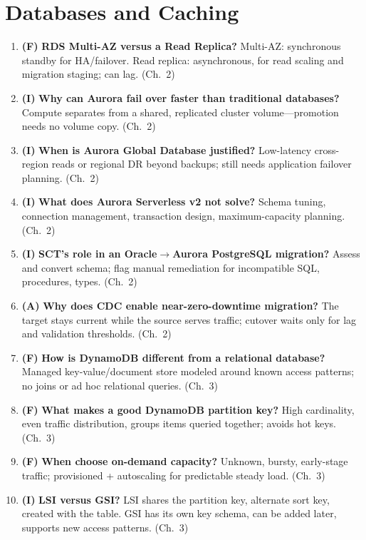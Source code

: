 \section{Databases and Caching}
\begin{enumerate}
    \item \textbf{(F)} \textbf{RDS Multi-AZ versus a Read Replica?}
    Multi-AZ: synchronous standby for HA/failover. Read replica: asynchronous, for read scaling
    and migration staging; can lag. (Ch.~2)
    \item \textbf{(I)} \textbf{Why can Aurora fail over faster than traditional databases?}
    Compute separates from a shared, replicated cluster volume---promotion needs no volume copy.
    (Ch.~2)
    \item \textbf{(I)} \textbf{When is Aurora Global Database justified?}
    Low-latency cross-region reads or regional DR beyond backups; still needs application failover
    planning. (Ch.~2)
    \item \textbf{(I)} \textbf{What does Aurora Serverless v2 not solve?}
    Schema tuning, connection management, transaction design, maximum-capacity planning.
    (Ch.~2)
    \item \textbf{(I)} \textbf{SCT's role in an Oracle$\rightarrow$Aurora PostgreSQL migration?}
    Assess and convert schema; flag manual remediation for incompatible SQL, procedures, types.
    (Ch.~2)
    \item \textbf{(A)} \textbf{Why does CDC enable near-zero-downtime migration?}
    The target stays current while the source serves traffic; cutover waits only for lag and
    validation thresholds. (Ch.~2)
    \item \textbf{(F)} \textbf{How is DynamoDB different from a relational database?}
    Managed key-value/document store modeled around known access patterns; no joins or ad hoc
    relational queries. (Ch.~3)
    \item \textbf{(F)} \textbf{What makes a good DynamoDB partition key?}
    High cardinality, even traffic distribution, groups items queried together; avoids hot keys.
    (Ch.~3)
    \item \textbf{(F)} \textbf{When choose on-demand capacity?}
    Unknown, bursty, early-stage traffic; provisioned + autoscaling for predictable steady load.
    (Ch.~3)
    \item \textbf{(I)} \textbf{LSI versus GSI?}
    LSI shares the partition key, alternate sort key, created with the table. GSI has its own key
    schema, can be added later, supports new access patterns. (Ch.~3)

\end{enumerate}
